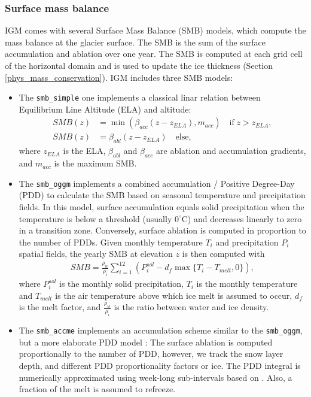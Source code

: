 \documentclass[gmd]{copernicus}
\begin{document}
\subsubsection{Surface mass balance}
\label{phys_smb}

IGM comes with several Surface Mass Balance (SMB) models, which compute the mass balance at the glacier surface. The SMB is the sum of the surface accumulation and ablation over one year. The SMB is computed at each grid cell of the horizontal domain and is used to update the ice thickness (Section \ref{phys_mass_conservation}). IGM includes three SMB models:

\begin{itemize}
\item The \texttt{smb\_simple} one implements a classical linar relation between Equilibrium Line Altitude (ELA) and altitude:
\begin{align}
SMB(z) & = \min(\beta_{acc} (z-z_{ELA}),m_{acc})\quad\textrm{if}\;z>z_{ELA}, \label{smb1} \\
SMB(z) & = \beta_{abl} (z-z_{ELA})\quad\textrm{else}, \label{smb2} 
\end{align}
where $z_{ELA}$ is the ELA, $\beta_{abl}$ and $\beta_{acc}$ are ablation and accumulation gradients, and $m_{acc}$ is the maximum SMB.
 
\item The \texttt{smb\_oggm} implements a combined accumulation / Positive Degree-Day (PDD) \citep{hock2003} to calculate the SMB based on seasonal temperature and precipitation fields. In this model, surface accumulation equals solid precipitation when the temperature is below a threshold (usually $0^{\circ}$C) and decreases linearly to zero in a transition zone. Conversely, surface ablation is computed in proportion to the number of PDDs. Given monthly temperature $T_i$ and precipitation $P_i$ spatial fields, the yearly SMB at elevation $z$ is then computed with 
\begin{align}
SMB = \frac{\rho_w}{\rho_i} \sum_{i=1}^{12} \left( P_i^{sol} - d_f \max \{ T_i - T_{melt}, 0 \} \right),
\label{smb3} 
\end{align}
where $P_i^{sol}$ is the monthly solid precipitation, $T_i$ is the monthly temperature and $T_{melt}$ is the air temperature above which ice melt is assumed to occur, $d_f$ is the melt factor, and $\frac{\rho_w}{\rho_i}$ is the ratio between water and ice density.

\item The \texttt{smb\_accme} implements an accumulation scheme similar to the \texttt{smb\_oggm}, but a more elaborate PDD model \citep[cf.][]{hock2003}: The surface ablation is computed proportionally to the number of PDD, however, we track the snow layer depth, and different PDD proportionality factors or ice. The PDD integral is numerically approximated using week-long sub-intervals based on \citet{calov2005}. Also, a fraction of the melt is assumed to refreeze.

\end{itemize}
 
\end{document}

